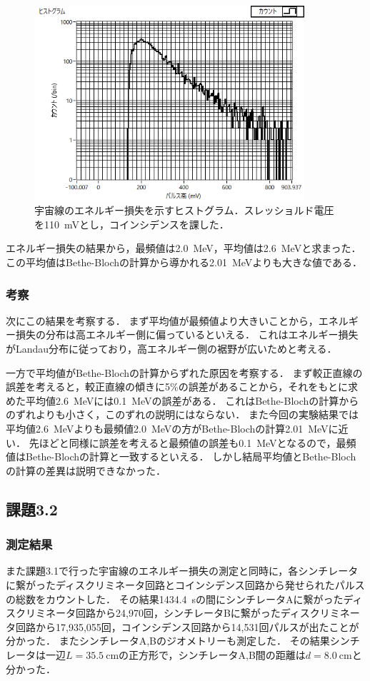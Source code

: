 \documentclass[a4paper,11pt]{jsarticle}
\begin{document}
\begin{figure}[htbp]
  \centering
  \includegraphics[width=10cm]{cosmray_110mV_coin.png}
  \caption{宇宙線のエネルギー損失を示すヒストグラム．スレッショルド電圧を\SI{110}{\mV}とし，コインシデンスを課した．}
  \label{fig:cosmray_110mV_coin}
\end{figure}

エネルギー損失の結果から，最頻値は\SI{2.0}{\MeV}，平均値は\SI{2.6}{\MeV}と求まった．
この平均値はBethe-Blochの計算から導かれる\SI{2.01}{\MeV}よりも大きな値である．

\subsubsection{考察}
次にこの結果を考察する．
まず平均値が最頻値より大きいことから，エネルギー損失の分布は高エネルギー側に偏っているといえる．
これはエネルギー損失がLandau分布に従っており，高エネルギー側の裾野が広いためと考える．

一方で平均値がBethe-Blochの計算からずれた原因を考察する．
まず較正直線の誤差を考えると，較正直線の傾きに5\%の誤差があることから，それをもとに求めた平均値\SI{2.6}{\MeV}には\SI{0.1}{\MeV}の誤差がある．
これはBethe-Blochの計算からのずれよりも小さく，このずれの説明にはならない．
また今回の実験結果では平均値\SI{2.6}{\MeV}よりも最頻値\SI{2.0}{\MeV}の方がBethe-Blochの計算\SI{2.01}{\MeV}に近い．
先ほどと同様に誤差を考えると最頻値の誤差も\SI{0.1}{\MeV}となるので，最頻値はBethe-Blochの計算と一致するといえる．
しかし結局平均値とBethe-Blochの計算の差異は説明できなかった．

\subsection{課題3.2}
\subsubsection{測定結果}
また課題3.1で行った宇宙線のエネルギー損失の測定と同時に，各シンチレータに繋がったディスクリミネータ回路とコインシデンス回路から発せられたパルスの総数をカウントした．
その結果\SI{1434.4}{s}の間にシンチレータAに繋がったディスクリミネータ回路から24,970回，シンチレータBに繋がったディスクリミネータ回路から17,935,055回，コインシデンス回路から14,531回パルスが出たことが分かった．
またシンチレータA,Bのジオメトリーも測定した．
その結果シンチレータは一辺$L=\SI{35.5}{\cm}$の正方形で，シンチレータA,B間の距離は$d=\SI{8.0}{\cm}$と分かった．
\end{document}
